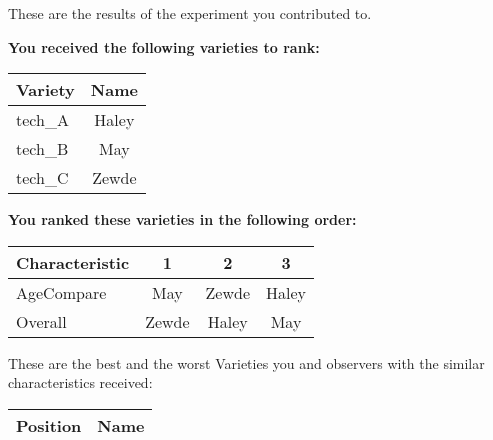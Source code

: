 \documentclass[10pt]{article}
\begin{document}
\begin{titlepage}
	These are the results of the experiment you contributed to.

	\begin{flushleft}
		\textbf{You received the following varieties to rank: }\hfill \break
		\begin{tabularx}{\textwidth}{ X | c  }
			\hline
			\textbf{Variety} & \textbf{Name} \\ \hline

			
				tech\_A & Haley \\ \hline
			
				tech\_B & May \\ \hline
			
				tech\_C & Zewde \\ \hline
			


		\end{tabularx}\newline \newline

		\textbf{You ranked these varieties in the following order: }\hfill \break
		\begin{tabularx}{\textwidth}{ X | c | c | c  }
			\hline
			\textbf{Characteristic}
			
				& \textbf{ 1 }
			
				& \textbf{ 2 }
			
				& \textbf{ 3 }
			
			\\ \hline


			
				AgeCompare & May  & Zewde  & Haley  \\ \hline


			
				Overall & Zewde  & Haley  & May  \\ \hline


			

		\end{tabularx}

	\end{flushleft}

	\pagebreak

	\begin{flushleft}
		These are the best and the worst Varieties you and observers with the similar characteristics received:\hfill \break \newline
		\begin{tabularx}{\textwidth}{ X | X  }
			\hline
			\textbf{Position} & \textbf{Name} \\ \hline


\end{tabularx}
\end{flushleft}
\end{titlepage}
\end{document}
